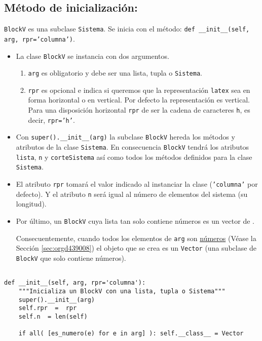 \documentclass[11pt]{report}
\begin{document}
\subsection{Método de inicialización:}
\label{sec:org822570b}

\texttt{BlockV} es una subclase \texttt{Sistema}. Se inicia con el método: \texttt{def
\_\_init\_\_(self, arg, rpr='columna')}.

\begin{itemize}
\item La clase \texttt{BlockV} se instancia con dos argumentos. 

\begin{enumerate}
\item \texttt{arg} es obligatorio y debe ser una lista, tupla o \texttt{Sistema}.

\item \texttt{rpr} es opcional e indica si queremos que la representación
\texttt{latex} sea en forma horizontal o en vertical. Por defecto la
representación es vertical. Para una disposición horizontal \texttt{rpr}
de ser la cadena de caracteres \texttt{h}, es decir, \texttt{rpr='h'}.
\end{enumerate}

\item Con \texttt{super().\_\_init\_\_(arg)} la subclase \texttt{BlockV} hereda los métodos
y atributos de la clase \texttt{Sistema}. En consecuencia \texttt{BlockV} tendrá
los atributos \texttt{lista}, \texttt{n} y \texttt{corteSistema} así como todos los
métodos definidos para la clase \texttt{Sistema}.

\item El atributo \texttt{rpr} tomará el valor indicado al instanciar la clase
(\texttt{'columna'} por defecto). Y el atributo \texttt{n} será igual al número de
elementos del sistema (su longitud).

\item Por último, un \texttt{BlockV} cuya lista tan solo contiene números es un
vector de \R[n].

Consecuentemente, cuando todos los elementos de \texttt{arg} son \hyperref[sec:orgd439008]{números}
(Véase la Sección \ref{sec:orgd439008}) el objeto que se crea es un \texttt{Vector} (una
subclase de \texttt{BlockV} que solo contiene números).
\end{itemize}


\begin{verbatim}

def __init__(self, arg, rpr='columna'):
    """Inicializa un BlockV con una lista, tupla o Sistema"""
    super().__init__(arg)
    self.rpr  =  rpr
    self.n  = len(self)
    
    if all( [es_numero(e) for e in arg] ): self.__class__ = Vector

\end{verbatim}
\end{document}
